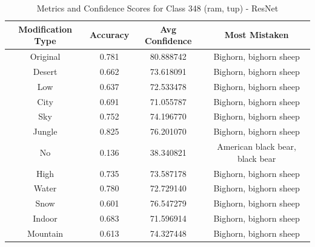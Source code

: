 \begin{table}
	\centering
	\begin{tabular}{|c|c|c|c|}
		\hline
		\textbf{Modification Type} & \textbf{Accuracy} & \textbf{Avg Confidence} & \textbf{Most Mistaken} \\
		\hline
		Original & 0.781 & 80.888742 & Bighorn, bighorn sheep \\
		\hline
		Desert & 0.662 & 73.618091 & Bighorn, bighorn sheep \\
		\hline
		Low & 0.637 & 72.533478 & Bighorn, bighorn sheep \\
		\hline
		City & 0.691 & 71.055787 & Bighorn, bighorn sheep \\
		\hline
		Sky & 0.752 & 74.196770 & Bighorn, bighorn sheep \\
		\hline
		Jungle & 0.825 & 76.201070 & Bighorn, bighorn sheep \\
		\hline
		No & 0.136 & 38.340821 & American black bear, black bear \\
		\hline
		High & 0.735 & 73.587178 & Bighorn, bighorn sheep \\
		\hline
		Water & 0.780 & 72.729140 & Bighorn, bighorn sheep \\
		\hline
		Snow & 0.601 & 76.547279 & Bighorn, bighorn sheep \\
		\hline
		Indoor & 0.683 & 71.596914 & Bighorn, bighorn sheep \\
		\hline
		Mountain & 0.613 & 74.327448 & Bighorn, bighorn sheep \\
		\hline
	\end{tabular}
	\caption{Metrics and Confidence Scores for Class 348 (ram, tup) - ResNet}
	\label{tab:metrics_confidence_class_348_resnet}
\end{table}


